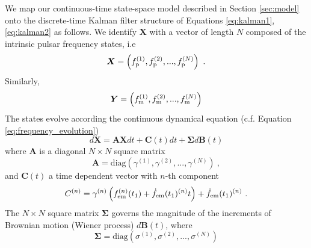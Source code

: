 \documentclass[fleqn,usenatbib,useAMS]{mnras}
\begin{document}
We map our continuous-time state-space model described in Section \ref{sec:model} onto the discrete-time Kalman filter structure of Equations  
\eqref{eq:kalman1}, \eqref{eq:kalman2} as follows. We identify $\boldsymbol{X}$ with a vector of length $N$ composed of the intrinsic pulsar frequency states, i.e 
\begin{equation}
	\boldsymbol{X} = \left(f_{\rm p}^{(1)}, f_{\rm p}^{(2)}, ..., f_{\rm p}^{(N)}\right) \ .
\end{equation}
Similarly,  
\begin{equation}
\boldsymbol{Y} = \left(f_{\rm m}^{(1)}, f_{\rm m}^{(2)}, ..., f_{\rm m}^{(N)} \right)
\end{equation}
The states evolve according the continuous dynamical equation (c.f. Equation \eqref{eq:frequency_evolution})
\begin{equation}
	d \boldsymbol{X} = \boldsymbol{A} \boldsymbol{X} dt + \boldsymbol{C}(t) dt + \boldsymbol{\Sigma} d \boldsymbol{B}(t) \label{eq:kalmn2}
\end{equation}
where $\boldsymbol{A}$ is a diagonal $N \times N$ square matrix
\begin{equation}
\boldsymbol{A} = \text{diag} \left(\gamma^{(1)}, \gamma^{(2)}, ..., \gamma^{(N)}\right) \ ,
\end{equation}
and $\boldsymbol{C}(t)$ a time dependent vector with $n$-th component
\begin{equation}
 C^{(n)} =\gamma^{(n)} \left(f_{\rm em}^{(n)} (t_1) + \dot{f}_{\rm em}(t_1)^{(n)} t \right) +  \dot{f}_{\rm em}(t_1)^{(n)} \ .
\end{equation}
The $N \times N$ square matrix $\boldsymbol{\Sigma}$  governs the magnitude of the increments of Brownian motion (Wiener process) $d\boldsymbol{B}(t)$, where
\begin{equation}
\boldsymbol{\Sigma} = \text{diag} \left(\sigma^{(1)}, \sigma^{(2)}, ..., \sigma^{(N)}\right)
\end{equation}
\newline 
\end{document}
